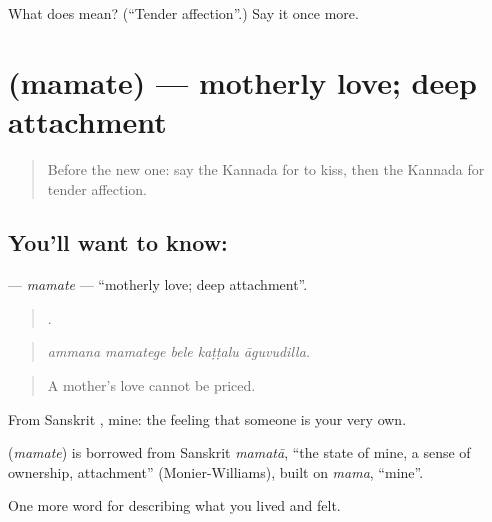 \begin{tcolorbox}[breakable,colback=teal!4,colframe=teal!35!black,title={Before you move on}]
What does  mean? (\textquotedblleft{}Tender affection\textquotedblright{}.) Say it once more.
\end{tcolorbox}
\section[\texorpdfstring{\kn{ಮಮತೆ} (mamate)}{ಮಮತೆ (mamate)}]{ (mamate) — motherly love; deep attachment}

\label{lesson:KA-C495-mamate}



\begin{quote}
Before the new one: say the Kannada for to kiss, then the Kannada for tender affection.
\end{quote}

\subsection*{You'll want to know: }
\textbf{} — \emph{mamate} — \textquotedblleft{}motherly love; deep attachment\textquotedblright{}.

\begin{quote}
    .
\end{quote}

\begin{quote}
\emph{ammana mamatege bele kaṭṭalu āguvudilla.}
\end{quote}

\begin{quote}
A mother's love cannot be priced.
\end{quote}

From Sanskrit , mine: the feeling that someone is your very own.

\begin{cousinweb}
\textbf{} (\emph{mamate}) is borrowed from Sanskrit \emph{mamatā}, \textquotedblleft{}the state of mine, a sense of ownership, attachment\textquotedblright{} (Monier-Williams), built on \emph{mama}, \textquotedblleft{}mine\textquotedblright{}.
\end{cousinweb}

\begin{grammarlens}[title={What you've built}]
One more word for describing what you lived and felt.
\end{grammarlens}

